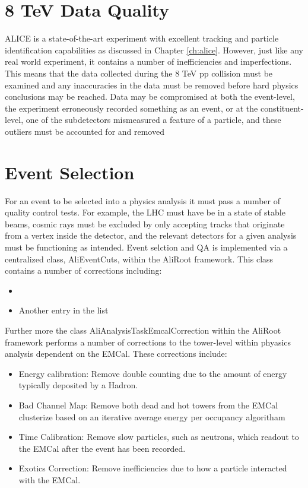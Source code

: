 \section{8 TeV Data Quality}
ALICE is a state-of-the-art experiment with excellent tracking and particle identification capabilities as discussed in Chapter \ref{ch:alice}.  However, just like any real world experiment, it contains a number of inefficiencies and imperfections.  This means that the data collected during the 8 TeV pp collision must be examined and any inaccuracies in the data must be removed before hard physics conclusions may be reached.  Data may be compromised at both the event-level, the experiment erroneously recorded something as an event, or at the constituent-level, one of the subdetectors mismeasured a feature of a particle, and these outliers must be accounted for and removed 

\section{Event Selection}

For an event to be selected into a physics analysis it must pass a number of quality control tests.  For example, the LHC must have be in a state of stable beams, cosmic rays must be excluded by only accepting tracks that originate from a vertex inside the detector, and the relevant detectors for a given analysis must be functioning as intended.  Event selction and QA is implemented via a centralized class, AliEventCuts, within the AliRoot framework.  This class contains a number of corrections including:

\begin{itemize}
  \item 
  \item Another entry in the list
\end{itemize}

Further more the class AliAnalysisTaskEmcalCorrection within the AliRoot framework performs a number of corrections to the tower-level within phyasics analysis dependent on the EMCal.  These corrections include:

\begin{itemize}
  \item Energy calibration:  Remove double counting due to the amount of energy typically deposited by a Hadron.
  \item Bad Channel Map: Remove both dead and hot towers from the EMCal clusterize based on an iterative average energy per occupancy algoritham
  \item Time Calibration:  Remove slow particles, such as neutrons, which readout to the EMCal after the event has been recorded.
   \item Exotics Correction:  Remove inefficiencies due to how a particle interacted with the EMCal.
\end{itemize}\

